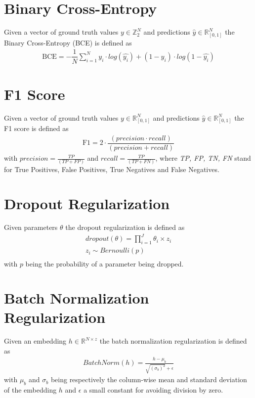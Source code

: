 \section{Binary Cross-Entropy}
Given a vector of ground truth values $y \in \mathbb{Z}_2^N$ and predictions $\widehat{y} \in \mathbb{R}^N_{[0, 1]}$ the Binary Cross-Entropy (BCE)  is defined as 
\begin{gather}
\label{bce}
    \text{BCE}=
        -\dfrac
            {1}
            {N}
        \sum\limits_{i=1}^{N}  y_i \cdot log(\hat{y_i}) + (1-y_i) \cdot log(1 - \hat{y_i})
\end{gather}

\section{F1 Score}
Given a vector of ground truth values $y \in \mathbb{R}^N_{[0, 1]}$ and predictions $\widehat{y} \in \mathbb{R}^N_{[0, 1]}$ the F1 score is defined as 
\begin{gather}
\label{F1}
    \text{F1}=
        2 \cdot 
        \dfrac
            {(precision \cdot recall)}
            {(precision + recall)}
\end{gather}
with $precision =\frac {TP}{(TP + FP)}$ and $recall = \frac {TP}{(TP + FN)}$, where \textit{TP, FP, TN, FN} stand for True Positives, False Positives, True Negatives and False Negatives. 

\section{Dropout Regularization}
Given parameters $\theta$ the dropout regularization is defined as 
\begin{gather}
    \label{dropout}
    dropout(\theta) = \prod^J _{i=1} \theta_i \times z_i \\ \nonumber
    z_i \sim Bernoulli(p) \\ \nonumber
\end{gather}
with $p$ being the probability of a parameter being dropped. 

\section{Batch Normalization Regularization}
Given an embedding  $h \in \mathbb{R}^{N\times z}$ the batch normalization regularization is defined as 
\begin{gather}
    \label{batch_norm}
    BatchNorm(h) = \frac{h - \mu_b}{\sqrt{(\sigma_b)^2} + \epsilon}
\end{gather}
with $\mu_b$ and $\sigma_b$ being respectively the column-wise mean and standard deviation of the embedding $h$ and $\epsilon$ a small constant for avoiding division by zero.

